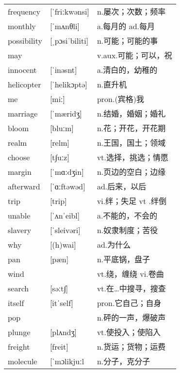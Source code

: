 \documentclass[a4paper]{article}
\begin{document}
\section{}
\begin{tabular}{l l l}

frequency & [ˈfriːkwənsi] & n.屡次；次数；频率 \\
monthly & [ˈmʌnθli] & a.每月的 ad.每月 \\
possibility & [ˌpɔsiˈbiliti] & n.可能；可能的事 \\
may &  & v.aux.可能；可以，祝 \\
innocent & [ˈinəsnt] & a.清白的，幼稚的 \\
helicopter & [ˈhelikɔptə] & n.直升机 \\
me & [miː] & pron.(宾格)我 \\
marriage & [ˈmæridʒ] & n.结婚，婚姻；婚礼 \\
bloom & [bluːm] & n.花；开花，开花期 \\
realm & [relm] & n.王国，国土；领域 \\
choose & [t∫uːz] & vt.选择，挑选；情愿 \\
margin & [ˈmɑːdʒin] & n.页边的空白；边缘 \\
afterward & [ˈɑːftəwəd] & ad.后来，以后 \\
trip & [trip] & vi.绊；失足 vt .绊倒 \\
unable & [ˈʌnˈeibl] & a.不能的，不会的 \\
slavery & [ˈsleivəri] & n.奴隶制度；苦役 \\
why & [(h)wai] & ad.为什么 \\
pan & [pæn] & n.平底锅，盘子 \\
wind &  & vt.绕，缠绕 vi.卷曲 \\
search & [səːt∫] & vt.在…中搜寻，搜查 \\
itself & [itˈself] & pron.它自己；自身 \\
pop &  & n.砰的一声，爆破声 \\
plunge & [plʌndʒ] & vt.使投入；使陷入 \\
freight & [freit] & n.货运；货物；运费 \\
molecule & [ˈmɔlikjuːl & n.分子，克分子 \\

\end{tabular}
\end{document}
